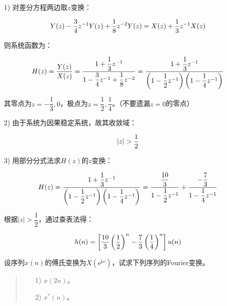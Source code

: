 \documentclass[cn, hazy, blue, normal, 12pt]{elegantnote}
\begin{document}
\begin{solution}[print=true]
    
1) 对差分方程两边取$z$变换：

\begin{equation}
\notag
    Y(z)-\frac{3}{4}z^{-1}Y(z)+\frac{1}{8}z^{-2}Y(z)=X(z)+\frac{1}{3}z^{-1}X(z)
\end{equation}

则系统函数为：

\begin{equation}
\notag
    H(z)=\dfrac{Y(z)}{X(z)}=\dfrac{1+\dfrac{1}{3}z^{-1}}{1-\dfrac{3}{4}z^{-1}+\dfrac{1}{8}z^{-2}}=\dfrac{1+\dfrac{1}{3}z^{-1}}{\left(1-\dfrac{1}{2}z^{-1}\right)\left(1-\dfrac{1}{4}z^{-1}\right)}
\end{equation}

其零点为$z=-\dfrac{1}{3}, 0$，极点为$z=\dfrac{1}{2}, \dfrac{1}{4}$。（不要遗漏$z=0$的零点）

2) 由于系统为因果稳定系统，故其收敛域：

\begin{equation}
    \notag
    |z|>\frac{1}{2}
\end{equation}

3) 用部分分式法求$H(z)$的$z$变换：

\begin{equation}
    \notag
    H(z)=\dfrac{1+\dfrac{1}{3}z^{-1}}{\left(1-\dfrac{1}{2}z^{-1}\right)\left(1-\dfrac{1}{4}z^{-1}\right)}=\dfrac{\dfrac{10}{3}}{1-\dfrac{1}{2}z^{-1}}+\dfrac{-\dfrac{7}{3}}{1-\dfrac{1}{4}z^{-1}}
\end{equation}

根据$|z|>\dfrac{1}{2}$，通过查表法得：

\begin{equation}
    \notag
    h(n)=\left[\dfrac{10}{3}\left(\dfrac{1}{2}\right)^n-\dfrac{7}{3}\left(\dfrac{1}{4}\right)^n\right]u(n)
\end{equation}

\end{solution}

\begin{exercise}

设序列$x(n)$的傅氏变换为$X\left(\text{e}^{\text{j}\omega}\right)$，试求下列序列的Fourier变换。

\begin{quote}
\begin{itemize}
    \item[1)] $x(2n)$。
    \item[2)] $x^*(n)$。
\end{itemize}
\end{quote}

\end{exercise}
\end{document}
